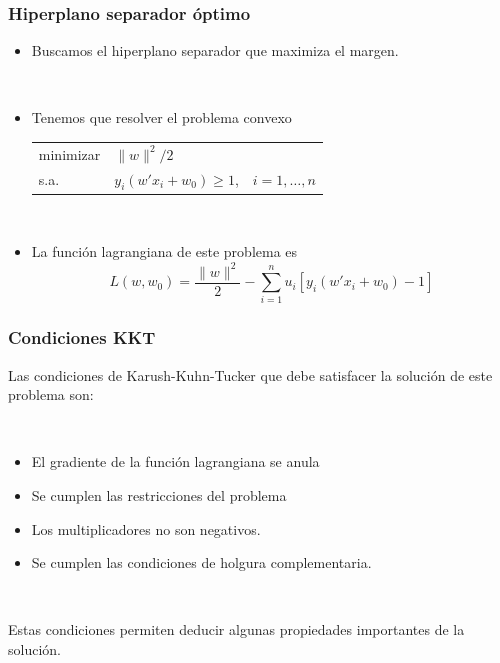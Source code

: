 \documentclass[dvipsnames, pdflatex,slidecentered]{beamer}
\begin{document}
\begin{frame}[plain]
\frametitle{Hiperplano separador óptimo}

\begin{itemize}

\item Buscamos el hiperplano separador que maximiza el margen.



\

\item Tenemos que resolver el problema convexo

\begin{center}
\begin{tabular}{lll}
minimizar & $\|w\|^2 / 2$ \\
s.a. & $y_i(w' x_i + w_0)\geq 1$,  &  $i=1,\ldots,n$
\end{tabular}
\end{center}

\

\item La función lagrangiana de este problema es
\[
L(w,w_0) = \frac{\|w\|^2}{2} - \sum_{i=1}^n u_i[y_i(w'x_i+w_0)-1] 
\]

\end{itemize}

\end{frame}
\begin{frame}[plain]
\frametitle{Condiciones KKT}

Las condiciones de Karush-Kuhn-Tucker que debe satisfacer la solución de este problema son:

\



\begin{itemize}
\item El gradiente de la función lagrangiana se anula



\item Se cumplen las restricciones del problema



\item Los multiplicadores no son negativos.



\item Se cumplen las condiciones de holgura complementaria.

\end{itemize}

\

Estas condiciones permiten deducir algunas propiedades importantes de la solución.

\end{frame}
\end{document}
